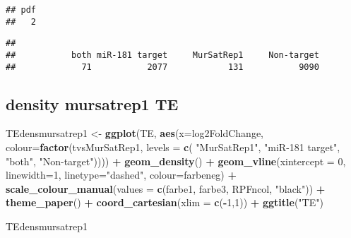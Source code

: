 \documentclass[
]{article}
\newenvironment{Shaded}{\begin{snugshade}}{\end{snugshade}}
\newcommand{\AttributeTok}[1]{\textcolor[rgb]{0.13,0.29,0.53}{#1}}
\newcommand{\DecValTok}[1]{\textcolor[rgb]{0.00,0.00,0.81}{#1}}
\newcommand{\FunctionTok}[1]{\textcolor[rgb]{0.13,0.29,0.53}{\textbf{#1}}}
\newcommand{\NormalTok}[1]{#1}
\newcommand{\OtherTok}[1]{\textcolor[rgb]{0.56,0.35,0.01}{#1}}
\newcommand{\SpecialCharTok}[1]{\textcolor[rgb]{0.81,0.36,0.00}{\textbf{#1}}}
\newcommand{\StringTok}[1]{\textcolor[rgb]{0.31,0.60,0.02}{#1}}
\begin{document}
\begin{verbatim}
## pdf 
##   2
\end{verbatim}

\begin{Shaded}
\end{Shaded}

\begin{verbatim}
## 
##           both miR-181 target     MurSatRep1     Non-target 
##             71           2077            131           9090
\end{verbatim}

\hypertarget{density-mursatrep1-te}{%
\subsection{density mursatrep1 TE}\label{density-mursatrep1-te}}

\begin{Shaded}
\begin{Highlighting}[]
\NormalTok{TEdensmursatrep1 }\OtherTok{\textless{}{-}} \FunctionTok{ggplot}\NormalTok{(TE, }\FunctionTok{aes}\NormalTok{(}\AttributeTok{x=}\NormalTok{log2FoldChange, }\AttributeTok{colour=}\FunctionTok{factor}\NormalTok{(tvsMurSatRep1, }\AttributeTok{levels =} \FunctionTok{c}\NormalTok{( }\StringTok{"MurSatRep1"}\NormalTok{, }\StringTok{"miR{-}181 target"}\NormalTok{, }\StringTok{"both"}\NormalTok{, }\StringTok{"Non{-}target"}\NormalTok{)))) }\SpecialCharTok{+}
  \FunctionTok{geom\_density}\NormalTok{() }\SpecialCharTok{+}
  \FunctionTok{geom\_vline}\NormalTok{(}\AttributeTok{xintercept =} \DecValTok{0}\NormalTok{, }\AttributeTok{linewidth=}\DecValTok{1}\NormalTok{, }\AttributeTok{linetype=}\StringTok{"dashed"}\NormalTok{, }\AttributeTok{colour=}\NormalTok{farbeneg) }\SpecialCharTok{+}
  \FunctionTok{scale\_colour\_manual}\NormalTok{(}\AttributeTok{values =} \FunctionTok{c}\NormalTok{(farbe1, farbe3, RPFncol, }\StringTok{"black"}\NormalTok{)) }\SpecialCharTok{+}
  \FunctionTok{theme\_paper}\NormalTok{() }\SpecialCharTok{+}
  \FunctionTok{coord\_cartesian}\NormalTok{(}\AttributeTok{xlim =} \FunctionTok{c}\NormalTok{(}\SpecialCharTok{{-}}\DecValTok{1}\NormalTok{,}\DecValTok{1}\NormalTok{)) }\SpecialCharTok{+}
  \FunctionTok{ggtitle}\NormalTok{(}\StringTok{"TE"}\NormalTok{)}

\NormalTok{TEdensmursatrep1}
\end{Highlighting}
\end{Shaded}
\end{document}
